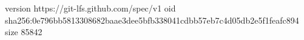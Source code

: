 version https://git-lfs.github.com/spec/v1
oid sha256:0e796bb5813308682baae3dee5bfb338041cdbb57eb7c4d05db2e5f1feafc894
size 85842
